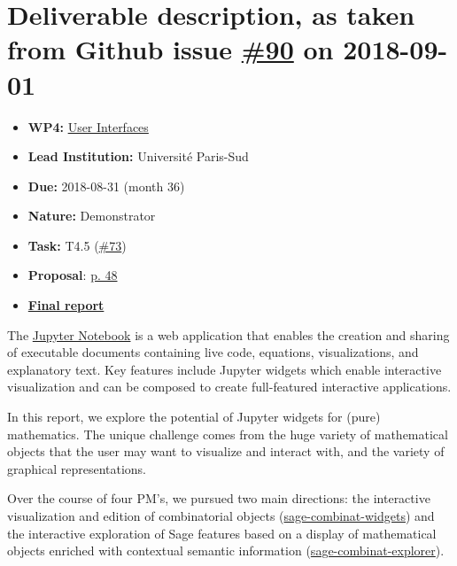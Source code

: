 \section*{\texorpdfstring{Deliverable description, as taken from Github
issue
\href{https://github.com/OpenDreamKit/OpenDreamKit/issues/90}{\#90} on
2018-09-01}{Deliverable description, as taken from Github issue \#90 on 2018-09-01}}

\begin{itemize}
\tightlist
\item
  \textbf{WP4:}
  \href{https://github.com/OpenDreamKit/OpenDreamKit/tree/master/WP4}{User
  Interfaces}
\item
  \textbf{Lead Institution:} Université Paris-Sud
\item
  \textbf{Due:} 2018-08-31 (month 36)
\item
  \textbf{Nature:} Demonstrator
\item
  \textbf{Task:} T4.5
  (\href{https://github.com/OpenDreamKit/OpenDreamKit/issues/73}{\#73})
\item
  \textbf{Proposal}:
  \href{https://github.com/OpenDreamKit/OpenDreamKit/raw/master/Proposal/proposal-www.pdf}{p.
  48}
\item
  \textbf{\href{https://github.com/OpenDreamKit/OpenDreamKit/blob/master/WP4/D4.16/report-final.pdf}{Final
  report}}
\end{itemize}

The \href{https://jupyter.org}{Jupyter Notebook} is a web application
that enables the creation and sharing of executable documents containing
live code, equations, visualizations, and explanatory text. Key features
include Jupyter widgets which enable interactive visualization and can
be composed to create full-featured interactive applications.

In this report, we explore the potential of Jupyter widgets for (pure)
mathematics. The unique challenge comes from the huge variety of
mathematical objects that the user may want to visualize and interact
with, and the variety of graphical representations.

Over the course of four PM's, we pursued two main directions: the
interactive visualization and edition of combinatorial objects
(\href{https://github.com/sagemath/sage-combinat-widgets}{sage-combinat-widgets})
and the interactive exploration of Sage features based on a display of
mathematical objects enriched with contextual semantic information
(\href{https://github.com/sagemath/sage-explorer}{sage-combinat-explorer}).

